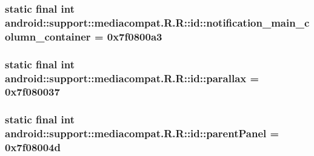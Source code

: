 \hypertarget{classandroid_1_1support_1_1mediacompat_1_1_r_1_1id_2c549a66a4de84f35156807a5e9b867f}{
\subsubsection[{notification\_\-main\_\-column\_\-container}]{\setlength{\rightskip}{0pt plus 5cm}static final int android::support::mediacompat.R.R::id::notification\_\-main\_\-column\_\-container = 0x7f0800a3}}
\label{classandroid_1_1support_1_1mediacompat_1_1_r_1_1id_2c549a66a4de84f35156807a5e9b867f}


\hypertarget{classandroid_1_1support_1_1mediacompat_1_1_r_1_1id_e49353cbfa030c00e57e3f866e565d92}{
\subsubsection[{parallax}]{\setlength{\rightskip}{0pt plus 5cm}static final int android::support::mediacompat.R.R::id::parallax = 0x7f080037}}
\label{classandroid_1_1support_1_1mediacompat_1_1_r_1_1id_e49353cbfa030c00e57e3f866e565d92}


\hypertarget{classandroid_1_1support_1_1mediacompat_1_1_r_1_1id_a4329ae5eb4dda9c208a146db33ef2b7}{
\subsubsection[{parentPanel}]{\setlength{\rightskip}{0pt plus 5cm}static final int android::support::mediacompat.R.R::id::parentPanel = 0x7f08004d}}
\label{classandroid_1_1support_1_1mediacompat_1_1_r_1_1id_a4329ae5eb4dda9c208a146db33ef2b7}


